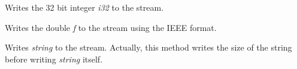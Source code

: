 
Writes the 32 bit integer {\it i32} to the stream.



Writes the double {\it f} to the stream using the IEEE format.



Writes {\it string} to the stream. Actually, this method writes the size of
the string before writing {\it string} itself.
